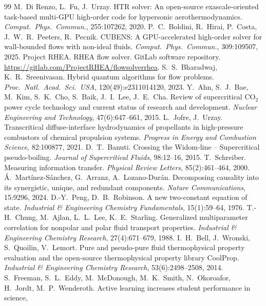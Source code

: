 \documentclass[11pt]{article}
\begin{document}
\begin{thebibliography}{99}
 M.\ Di Renzo, L.\ Fu, J.\ Urzay. HTR solver: An open-source exascale-oriented task-based multi-GPU high-order code for hypersonic aerothermodynamics. \emph{Comput.\ Phys.\ Commun.}, 255:107262, 2020.
 P.\ C.\ Boldini, R.\ Hirai, P.\ Costa, J.\ W.\ R.\ Peeters, R.\ Pecnik. CUBENS: A GPU-accelerated high-order solver for wall-bounded flows with non-ideal fluids. \emph{Comput.\ Phys.\ Commun.}, 309:109507, 2025.
 Project RHEA. RHEA flow solver. GitLab software repository. \url{https://gitlab.com/ProjectRHEA/flowsolverrhea}.
 S.\ S.\ Bharadwaj, K.\ R.\ Sreenivasan. Hybrid quantum algorithms for flow problems. \emph{Proc.\ Natl.\ Acad.\ Sci.\ USA}, 120(49):e2311014120, 2023.
 Y.\ Ahn, S.\ J.\ Bae, M.\ Kim, S.\ K.\ Cho, S.\ Baik, J.\ I.\ Lee, J.\ E.\ Cha.
Review of supercritical CO$_2$ power cycle technology and current status of research and
development. \emph{Nuclear Engineering and Technology}, 47(6):647--661, 2015.
 L.\ Jofre, J.\ Urzay. Transcritical diffuse-interface hydrodynamics
of propellants in high-pressure combustors of chemical propulsion systems. \emph{Progress
in Energy and Combustion Science}, 82:100877, 2021.
 D.\ T.\ Banuti. Crossing the Widom-line -- Supercritical pseudo-boiling.
\emph{Journal of Supercritical Fluids}, 98:12--16, 2015.
 T.\ Schreiber. Measuring information transfer. \emph{Physical Review
Letters}, 85(2):461--464, 2000.
 \'A.\ Mart\'inez-S\'anchez, G.\ Arranz, A.\ Lozano-Dur\'an.
Decomposing causality into its synergistic, unique, and redundant components. \emph{Nature
Communications}, 15:9296, 2024.
 D.-Y.\ Peng, D.\ B.\ Robinson. A new two-constant equation of
state. \emph{Industrial \& Engineering Chemistry Fundamentals}, 15(1):59--64, 1976.
 T.-H.\ Chung, M.\ Ajlan, L.\ L.\ Lee, K.\ E.\ Starling. Generalized
multiparameter correlation for nonpolar and polar fluid transport properties.
\emph{Industrial \& Engineering Chemistry Research}, 27(4):671--679, 1988.
 I.\ H.\ Bell, J.\ Wronski, S.\ Quoilin, V.\ Lemort. Pure and
pseudo-pure fluid thermophysical property evaluation and the open-source thermophysical
property library CoolProp. \emph{Industrial \& Engineering Chemistry Research},
53(6):2498--2508, 2014.
 S.\ Freeman, S.\ L.\ Eddy, M.\ McDonough, M.\ K.\ Smith, N.\ Okoroafor,
H.\ Jordt, M.\ P.\ Wenderoth. Active learning increases student performance in science,

\end{thebibliography}
\end{document}
